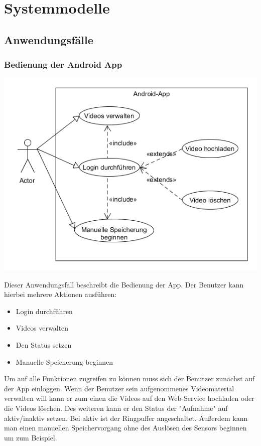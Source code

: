 \chapter{Systemmodelle}
\section{Anwendungsfälle}
\subsection{Bedienung der Android App}
\begin{center}
\includegraphics[width=1\textwidth]{subtopicsFuncspec/systemModels/App-AFD-UML.png}
\end{center}
Dieser Anwendungsfall beschreibt die Bedienung der App. 
Der Benutzer kann hierbei mehrere Aktionen ausführen:
\begin{itemize}
\item Login durchführen
\item Videos verwalten
\item Den Status setzen
\item Manuelle Speicherung beginnen
\end{itemize}
Um auf alle Funktionen zugreifen zu können muss sich der Benutzer zunächst auf der App einloggen. 
Wenn der Benutzer sein aufgenommenes Videomaterial verwalten will kann er zum einen die Videos auf den Web-Service hochladen oder die Videos löschen.
Des weiteren kann er den Status der "Aufnahme" auf aktiv/inaktiv setzen. Bei aktiv ist der Ringpuffer angeschaltet. 
Außerdem kann man einen manuellen Speichervorgang ohne des Auslösen des Sensors beginnen um zum Beispiel.

